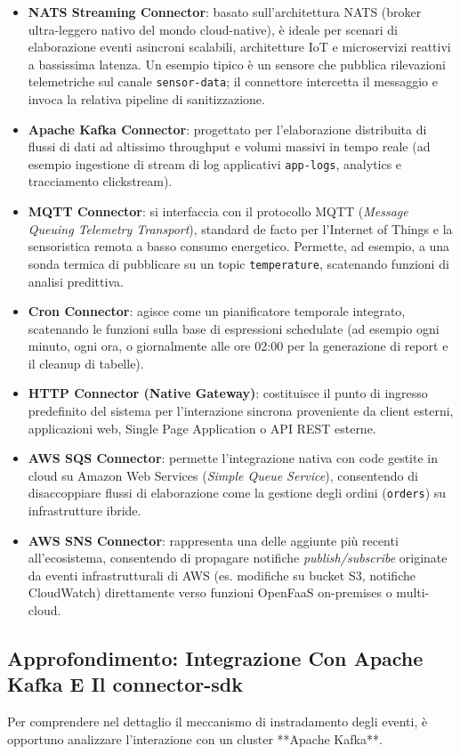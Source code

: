 \documentclass[11pt, a4paper]{article}
\begin{document}
\begin{itemize}
    \item \textbf{NATS Streaming Connector}: basato sull'architettura NATS (broker ultra-leggero nativo del mondo cloud-native), è ideale per scenari di elaborazione eventi asincroni scalabili, architetture IoT e microservizi reattivi a bassissima latenza. Un esempio tipico è un sensore che pubblica rilevazioni telemetriche sul canale \texttt{sensor-data}; il connettore intercetta il messaggio e invoca la relativa pipeline di sanitizzazione.
    \item \textbf{Apache Kafka Connector}: progettato per l'elaborazione distribuita di flussi di dati ad altissimo throughput e volumi massivi in tempo reale (ad esempio ingestione di stream di log applicativi \texttt{app-logs}, analytics e tracciamento clickstream).
    \item \textbf{MQTT Connector}: si interfaccia con il protocollo MQTT (\emph{Message Queuing Telemetry Transport}), standard de facto per l'Internet of Things e la sensoristica remota a basso consumo energetico. Permette, ad esempio, a una sonda termica di pubblicare su un topic \texttt{temperature}, scatenando funzioni di analisi predittiva.
    \item \textbf{Cron Connector}: agisce come un pianificatore temporale integrato, scatenando le funzioni sulla base di espressioni schedulate (ad esempio ogni minuto, ogni ora, o giornalmente alle ore 02:00 per la generazione di report e il cleanup di tabelle).
    \item \textbf{HTTP Connector (Native Gateway)}: costituisce il punto di ingresso predefinito del sistema per l'interazione sincrona proveniente da client esterni, applicazioni web, Single Page Application o API REST esterne.
    \item \textbf{AWS SQS Connector}: permette l'integrazione nativa con code gestite in cloud su Amazon Web Services (\emph{Simple Queue Service}), consentendo di disaccoppiare flussi di elaborazione come la gestione degli ordini (\texttt{orders}) su infrastrutture ibride.
    \item \textbf{AWS SNS Connector}: rappresenta una delle aggiunte più recenti all'ecosistema, consentendo di propagare notifiche \emph{publish/subscribe} originate da eventi infrastrutturali di AWS (es. modifiche su bucket S3, notifiche CloudWatch) direttamente verso funzioni OpenFaaS on-premises o multi-cloud.
\end{itemize}

\subsection{Approfondimento: Integrazione Con Apache Kafka E Il connector-sdk}
Per comprendere nel dettaglio il meccanismo di instradamento degli eventi, è opportuno analizzare l'interazione con un cluster **Apache Kafka**.
\end{document}
